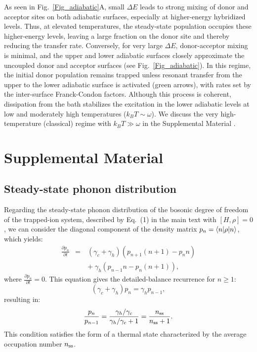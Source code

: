 \documentclass[
reprint,
superscriptaddress,

amsmath,amssymb,
aps,
prl,

floatfix,
]{revtex4-2}
\begin{document}
As seen in Fig.~\ref{Fig_adiabatic}A, small $\Delta E$ leads to strong mixing of donor and acceptor sites on both adiabatic surfaces, especially at higher-energy hybridized levels. Thus, at elevated temperatures, the steady-state population occupies these higher-energy levels, leaving a large fraction on the donor site and thereby reducing the transfer rate. Conversely, for very large $\Delta E$, donor-acceptor mixing is minimal, and the upper and lower adiabatic surfaces closely approximate the uncoupled donor and acceptor surfaces (see Fig.~\ref{Fig_adiabatic}). In this regime, the initial donor population remains trapped unless resonant transfer from the upper to the lower adiabatic surface is activated (green arrows), with rates set by the inter-surface Franck-Condon factors. Although this process is coherent, dissipation from the bath stabilizes the excitation in the lower adiabatic levels at low and moderately high temperatures ($k_B T \sim \omega$). We discuss the very high-temperature (classical) regime with $k_B T\gg\omega$ in the Supplemental Material \cite{so2025fT_supp}.

\setcounter{figure}{0}
\renewcommand{\figurename}{Figure}
\renewcommand{\thefigure}{S\arabic{figure}}
\setcounter{equation}{0}
\renewcommand{\theequation}{S.\arabic{equation}}
\section*{Supplemental Material}

\subsection*{Steady-state phonon distribution}
\label{app_steady}

Regarding the steady-state phonon distribution of the bosonic degree of freedom of the trapped-ion system, described by Eq.~(1) in the main text \cite{so2025fT} with $[H,\rho]=0$, we can consider the diagonal component of the density matrix $p_n=\braket{n|\rho|n}$, which yields:
\begin{eqnarray}
    \frac{\partial p_n}{\partial t}&=&(\gamma_c+\gamma_h)(p_{n+1}(n+1)-p_n n) \nonumber \\
    &\quad&+\;\gamma_h(p_{n-1} n - p_{n}(n+1)),
\end{eqnarray}
where $\frac{\partial p_n}{\partial t}=0$. This equation gives the detailed-balance recurrence for $n\geq1$:
\begin{equation}
    (\gamma_c+\gamma_h) p_n = \gamma_h p_{n-1},
\end{equation}
resulting in:
\begin{equation}
    \frac{p_{n}}{p_{n-1}}=\frac{\gamma_h/\gamma_c}{\gamma_h/\gamma_c+1}=\frac{n_{\rm ss}}{n_{\rm ss}+1}.
\end{equation}
This condition satisfies the form of a thermal state characterized by the average occupation number $n_{\rm ss}$.
\end{document}
